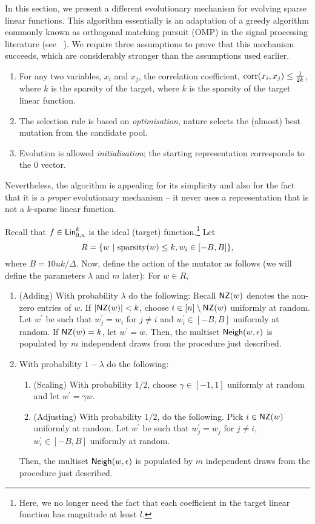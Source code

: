 In this section, we present a different evolutionary mechanism for evolving
sparse linear functions. This algorithm essentially is an adaptation of a greedy
algorithm commonly known as orthogonal matching pursuit (OMP) in the signal
processing literature (see ~\cite{Donoho:2006-recovery, Tropp:2004-greed}). We
require three assumptions to prove that this mechanism succeeds, which are
considerably stronger than the assumptions used earlier.
\begin{enumerate}
%
\item For any two variables, $x_i$ and $x_j$, the correlation coefficient,
$\mathrm{corr}(x_i, x_j) \leq \frac{1}{2k}$, where $k$ is the sparsity of the target,
where $k$ is the sparsity of the target linear function.
%
\item The selection rule is based on \emph{optimisation}, \ie nature selects the
(almost) best mutation from the candidate pool. 
%
\item Evolution is allowed \emph{initialisation}; the starting representation
corresponds to the $0$ vector.
%
\end{enumerate}

Nevertheless, the algorithm is appealing for its simplicity and also for the fact
that it is a \emph{proper} evolutionary mechanism -- it never uses a
representation that is not a $k$-sparse linear function. 

Recall that $f \in  \mathsf{Lin}^k_{0, u}$ is the ideal (target)
function.\footnote{Here, we no longer need the fact that each coefficient in the
target linear function has magnitude at least $l$.} Let 
%
\[ R = \{w ~|~ \mathrm{sparsity}(w) \leq k, w_i \in [-B, B] \}, \]
%
where $B = 10uk/\Delta$. Now, define the action of the mutator as follows (we
will define the parameters $\lambda$ and $m$ later): For $w \in R$, 
\begin{enumerate}
\item (Adding) With probability $\lambda$ do the following: Recall $\mathsf{NZ}(w)$
denotes the non-zero entries of $w$. If $|\mathsf{NZ}(w)| < k$, choose $i \in [n]
\setminus \mathsf{NZ}(w)$ uniformly at random. Let $w^\prime$ be such that $w^\prime_j =
w_i$ for $j \neq i$ and $w^\prime_i \in [-B, B]$ uniformly at random. If
$\mathsf{NZ}(w)= k$, let $w^\prime = w$. Then, the multiset $\mathsf{Neigh}(w, \epsilon)$ is
populated by $m$ independent draws from the procedure just described.
%
\item With probability $1 - \lambda$ do the following:
%
\begin{enumerate}
\item (Scaling) With probability $1/2$, choose $\gamma \in [-1, 1]$ uniformly at
random and let $w^\prime = \gamma w$.
%
\item (Adjusting) With probability $1/2$, do the following.  Pick $i \in \mathsf{NZ}(w)$
uniformly at random.  Let $w^\prime$ be such that $w^\prime_j = w_j$ for $j \neq
i$, $w^\prime_i \in [-B, B]$ uniformly at random.
\end{enumerate}
Then, the multiset $\mathsf{Neigh}(w, \epsilon)$ is populated by $m$ independent draws
from the procedure just described.
\end{enumerate}

